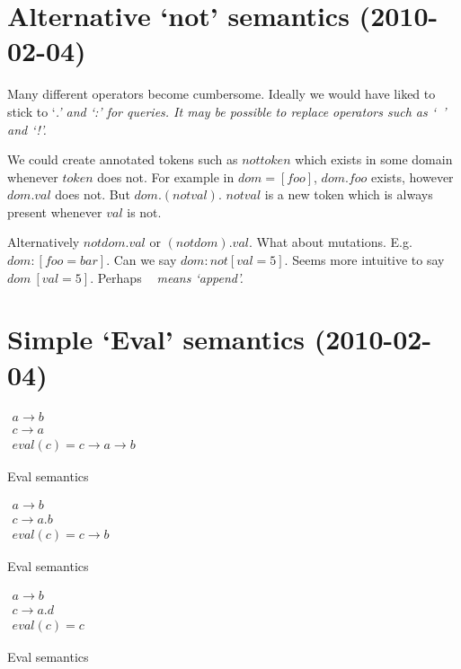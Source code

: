 \documentclass[11pt]{article}
\begin{document}
\section{Alternative `not' semantics (2010-02-04)}
Many different operators become cumbersome. Ideally we would have liked to stick to `\em{.}' and `\em{:}' for queries.
It may be possible to replace operators such as `\em{~}' and `\em{!}'.

We could create annotated tokens such as $not token$ which exists in some domain whenever $token$ does not.
For example in $dom = [ foo ]$,  $dom.foo$ exists, however $dom.val$ does not. But $dom.(not val)$.
$not val$ is a new token which is always present whenever $val$ is not.


Alternatively $not dom.val$ or $(not dom).val$.
What about mutations. E.g. $dom:[foo = bar]$.
Can we say $dom:not[ val = 5 ]$. Seems more intuitive to say $dom~[ val = 5 ]$. Perhaps \em{~} means `append'.


\section{Simple `Eval' semantics (2010-02-04)}

\begin{example}[H]
$
  \begin{array}{l}
    a \rightarrow b \\
    c \rightarrow a \\
    eval(c) = c \rightarrow a \rightarrow b
  \end{array}
$
\caption{Eval semantics}
\end{example}

\begin{example}[H]
$
  \begin{array}{l}
    a \rightarrow b \\
    c \rightarrow a.b \\
    eval(c) = c \rightarrow b
  \end{array}
$
\caption{Eval semantics}
\end{example}

\begin{example}[H]
$
  \begin{array}{l}
    a \rightarrow b \\
    c \rightarrow a.d \\
    eval(c) = c
  \end{array}
$
\caption{Eval semantics}
\end{example}
\end{document}
